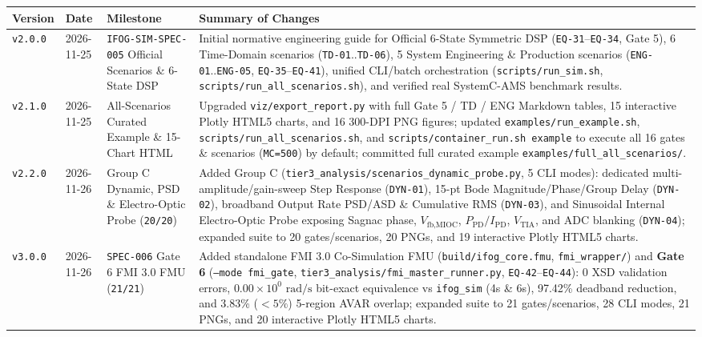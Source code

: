 \documentclass[11pt,a4paper]{article}
\begin{document}
\vspace{0.5em}
\begin{tabularx}{\textwidth}{@{}p{1.4cm} p{2.0cm} p{3.3cm} X@{}}
\toprule
\textbf{Version} & \textbf{Date} & \textbf{Milestone} & \textbf{Summary of Changes} \\
\midrule
\texttt{v2.0.0} & 2026-11-25 & \texttt{IFOG-SIM-SPEC-005} Official Scenarios \& 6-State DSP & Initial normative engineering guide for Official 6-State Symmetric DSP (\texttt{EQ-31}--\texttt{EQ-34}, Gate 5), 6 Time-Domain scenarios (\texttt{TD-01}..\texttt{TD-06}), 5 System Engineering \& Production scenarios (\texttt{ENG-01}..\texttt{ENG-05}, \texttt{EQ-35}--\texttt{EQ-41}), unified CLI/batch orchestration (\texttt{scripts/run\_sim.sh}, \texttt{scripts/run\_all\_scenarios.sh}), and verified real SystemC-AMS benchmark results. \\
\texttt{v2.1.0} & 2026-11-25 & All-Scenarios Curated Example \& 15-Chart HTML & Upgraded \texttt{viz/export\_report.py} with full Gate 5 / TD / ENG Markdown tables, 15 interactive Plotly HTML5 charts, and 16 300-DPI PNG figures; updated \texttt{examples/run\_example.sh}, \texttt{scripts/run\_all\_scenarios.sh}, and \texttt{scripts/container\_run.sh example} to execute all 16 gates \& scenarios (\texttt{MC=500}) by default; committed full curated example \texttt{examples/full\_all\_scenarios/}. \\
\texttt{v2.2.0} & 2026-11-26 & Group C Dynamic, PSD \& Electro-Optic Probe (\texttt{20/20}) & Added Group C (\texttt{tier3\_analysis/scenarios\_dynamic\_probe.py}, 5 CLI modes): dedicated multi-amplitude/gain-sweep Step Response (\texttt{DYN-01}), 15-pt Bode Magnitude/Phase/Group Delay (\texttt{DYN-02}), broadband Output Rate PSD/ASD \& Cumulative RMS (\texttt{DYN-03}), and Sinusoidal Internal Electro-Optic Probe exposing Sagnac phase, $V_{\text{fb,MIOC}}$, $P_{\text{PD}}/I_{\text{PD}}$, $V_{\text{TIA}}$, and ADC blanking (\texttt{DYN-04}); expanded suite to 20 gates/scenarios, 20 PNGs, and 19 interactive Plotly HTML5 charts. \\
\texttt{v3.0.0} & 2026-11-26 & \texttt{SPEC-006} Gate 6 FMI 3.0 FMU (\texttt{21/21}) & Added standalone FMI 3.0 Co-Simulation FMU (\texttt{build/ifog\_core.fmu}, \texttt{fmi\_wrapper/}) and \textbf{Gate 6} (\texttt{--mode fmi\_gate}, \texttt{tier3\_analysis/fmi\_master\_runner.py}, \texttt{EQ-42}--\texttt{EQ-44}): 0 XSD validation errors, $0.00\times 10^{0}\text{ rad/s}$ bit-exact equivalence vs \texttt{ifog\_sim} (4s \& 6s), 97.42\% deadband reduction, and 3.83\% ($<5\%$) 5-region AVAR overlap; expanded suite to 21 gates/scenarios, 28 CLI modes, 21 PNGs, and 20 interactive Plotly HTML5 charts. \\

\end{tabularx}
\end{document}

